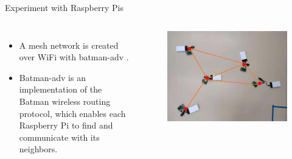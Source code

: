 \documentclass[10pt]{beamer}
\DeclareMathOperator{\1}{\textbf{1}}
\begin{document}
\begin{frame}{Experiment with Raspberry Pis}
	\begin{columns}[c]
	\column{7cm}
	\begin{itemize}
		\item A mesh network is created over WiFi with batman-adv \cite{batman-adv}.
		\item Batman-adv is an implementation of the Batman wireless routing protocol, which enables each Raspberry Pi to find and communicate with its neighbors.
	\end{itemize}
	\column{5cm}
	\begin{figure}
        \centering
        \includegraphics[width=1\textwidth]{pic/rpi_expriment.png}
    \end{figure}
	\end{columns}
\end{frame}
\end{document}
